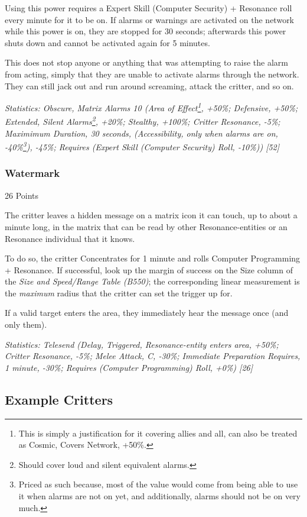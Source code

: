 \begin{multicols*}{3}
	Using this power requires a Expert Skill (Computer Security) + Resonance roll every minute for it to be on. If alarms or warnings are activated on the network while this power is on, they are stopped for 30 seconds; afterwards this power shuts down and cannot be activated again for 5 minutes.
	
	This does not stop anyone or anything that was attempting to raise the alarm from acting, simply that they are unable to activate alarms through the network. They can still jack out and run around screaming, attack the critter, and so on.

	\textcolor{OliveGreen}{\textit{Statistics: Obscure, Matrix Alarms 10 (Area of Effect\footnote{This is simply a justification for it covering allies and all, can also be treated as Cosmic, Covers Network, +50\%.}, +50\%; Defensive, +50\%; Extended, Silent Alarms\footnote{Should cover loud and silent equivalent alarms.}, +20\%; Stealthy, +100\%; Critter Resonance, -5\%; Maximimum Duration, 30 seconds, (Accessibility, only when alarms are on, -40\%\footnote{Priced as such because, most of the value would come from being able to use it when alarms are not on yet, and additionally, alarms should not be on very much.}), -45\%; Requires (Expert Skill (Computer Security) Roll, -10\%)) [52] }}

	\subsubsection{Watermark}\label{watermark}
	\begin{flushright}
		26 Points
	\end{flushright}

	The critter leaves a hidden message on a matrix icon it can touch, up to about a minute long, in the matrix that can be read by other Resonance-entities or an Resonance individual that it knows. 
	
	To do so, the critter Concentrates for 1 minute and rolls Computer Programming + Resonance. If successful, look up the margin of success on the Size column of the \textit{Size and Speed/Range Table (B550)}; the corresponding linear measurement is the \textit{maximum} radius that the critter can set the trigger up for.
	
	If a valid target enters the area, they immediately hear the message once (and only them).
	
	\textcolor{OliveGreen}{\textit{Statistics: Telesend (Delay, Triggered, Resonance-entity enters area, +50\%; Critter Resonance, -5\%; Melee Attack, C, -30\%; Immediate Preparation Requires, 1 minute, -30\%; Requires (Computer Programming) Roll, +0\%) [26] }}
	
	\subsection{Example Critters}
	
\end{multicols*}